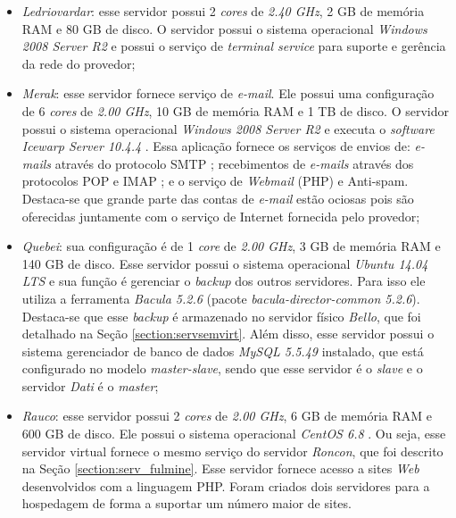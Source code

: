 \begin{itemize}
 \item \textit{Ledriovardar}: esse servidor possui 2 \textit{cores} de \textit{2.40 GHz}, 2 GB de memória \ac{RAM} e 80 GB de disco. 
 O servidor possui o sistema operacional \textit{Windows 2008 Server R2} e possui o serviço de \textit{terminal service} para suporte e gerência 
 da rede do provedor;
 
 \item \textit{Merak}: esse servidor fornece serviço de \textit{e-mail}. Ele possui uma configuração de 6 \textit{cores} de \textit{2.00 GHz}, 
 10 GB de memória \ac{RAM} e 1 TB de disco. O servidor possui o sistema operacional \textit{Windows 2008 Server R2} e executa o \textit{software} 
 \textit{Icewarp Server 10.4.4} \cite{icewarp}. Essa aplicação fornece os serviços de envios de: \textit{e-mails} através do protocolo 
 \ac{SMTP} \cite{kurose2006}; recebimentos de \textit{e-mails} através dos protocolos \ac{POP} \cite{kurose2006} e \ac{IMAP} \cite{kurose2006}; 
 e o serviço de \textit{Webmail} (\ac{PHP}) e Anti-spam. Destaca-se que grande parte das contas de \textit{e-mail} estão ociosas pois são oferecidas 
 juntamente com o serviço de Internet fornecida pelo provedor;
 
 \item \textit{Quebei}: sua configuração é de 1 \textit{core} de \textit{2.00 GHz}, 3 GB de memória \ac{RAM} e 140 GB de disco. 
 Esse servidor possui o sistema operacional \textit{Ubuntu 14.04 \ac{LTS}} \cite{ubuntu} e sua função é gerenciar o \textit{backup} dos outros 
 servidores. Para isso ele utiliza a ferramenta \textit{Bacula 5.2.6} \cite{bacula} (pacote \textit{bacula-director-common 5.2.6}). Destaca-se
 que esse \textit{backup} é armazenado no servidor físico \textit{Bello}, que foi detalhado na Seção \ref{section:servsemvirt}. Além disso, 
 esse servidor possui o sistema gerenciador de banco de dados \textit{MySQL 5.5.49} \cite{mysql} instalado, que está configurado no modelo 
 \textit{master-slave}, sendo que esse servidor é o \textit{slave} e o servidor \textit{Dati} é o \textit{master};
 
 \item \textit{Rauco}: esse servidor possui 2 \textit{cores} de \textit{2.00 GHz}, 6 GB de memória \ac{RAM} e 600 GB de disco. 
 Ele possui o sistema operacional \textit{CentOS 6.8} \cite{centos}. Ou seja, esse servidor virtual fornece o mesmo serviço do servidor \textit{Roncon}, 
 que foi descrito na Seção \ref{section:serv_fulmine}. Esse servidor fornece acesso a sites \textit{Web} desenvolvidos com a linguagem \ac{PHP}. 
 Foram criados dois servidores para a hospedagem de forma a suportar um número maior de sites.
\end{itemize}

